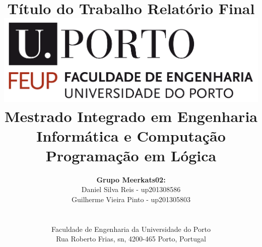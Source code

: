 \documentclass[a4paper]{article}
\begin{document}
\setlength{\textwidth}{16cm}
\setlength{\textheight}{22cm}

\title{\Huge\textbf{Título do Trabalho}\linebreak\linebreak\linebreak
\Large\textbf{Relatório Final}\linebreak\linebreak
\linebreak\linebreak
\includegraphics[scale=0.1]{feup-logo.png}\linebreak\linebreak
\linebreak\linebreak
\Large{Mestrado Integrado em Engenharia Informática e Computação} \linebreak\linebreak
\Large{Programação em Lógica}\linebreak
}

\author{\textbf{Grupo Meerkats02:}\\ Daniel Silva Reis - up201308586 \\ Guilherme Vieira Pinto - up201305803 \\\linebreak\linebreak \\
 \\ Faculdade de Engenharia da Universidade do Porto \\ Rua Roberto Frias, s\/n, 4200-465 Porto, Portugal \linebreak\linebreak\linebreak
\linebreak\linebreak\vspace{1cm}}
\maketitle
\thispagestyle{empty}
\end{document}
